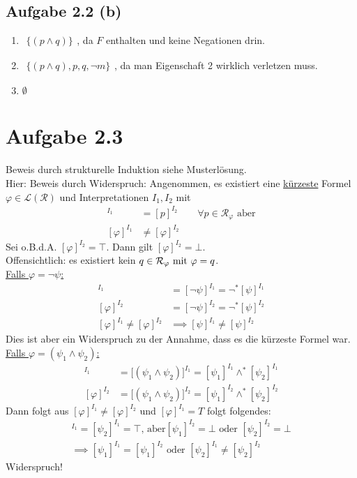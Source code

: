\documentclass[12pt,a4paper]{article}
\begin{document}
\subsection*{Aufgabe 2.2 (b)}
\begin{enumerate}[label=(\arabic*)]
\item $\begin{aligned}\big\lbrace
(p\wedge q)
\big\rbrace\end{aligned}$, da $F$ enthalten und keine Negationen drin.
\item $\begin{aligned}\big\lbrace
(p\wedge q), p, q, \neg m
\big\rbrace\end{aligned}$, da man Eigenschaft 2 wirklich verletzen muss.
\item $\emptyset$
\end{enumerate}

\section*{Aufgabe 2.3}
Beweis durch strukturelle Induktion siehe Musterlösung.\\
Hier: Beweis durch Widerspruch: Angenommen, es existiert eine \underline{kürzeste} Formel $\varphi\in\mathcal{L}(\mathcal{R})$ und Interpretationen $I_1,I_2$ mit 
\begin{align*}
[p]^{I_1}&=[p]^{I_2}\qquad\forall p\in\mathcal{R}_\varphi\text{ aber}\\
[\varphi]^{I_1}&\neq[\varphi]^{I_2}
\end{align*}
Sei o.B.d.A. $[\varphi]^{I_2}=\top$. Dann gilt $[\varphi]^{I_2}=\bot$.\\
Offensichtlich: es existiert kein $q\in\mathcal{R}_\varphi\mit\varphi=q$.\\
\underline{Falls $\varphi=\neg\psi$:}
\begin{align*}
[\varphi]^{I_1}&=[\neg\psi]^{I_1}=\neg^\ast[\psi]^{I_1}\\
[\varphi]^{I_2}&=[\neg\psi]^{I_2}=\neg^\ast[\psi]^{I_2}\\
[\varphi]^{I_1}\neq[\varphi]^{I_2}&\implies[\psi]^{I_1}\neq[\psi]^{I_2}
\end{align*}
Dies ist aber ein Widerspruch zu der Annahme, dass es die kürzeste Formel war.\\

\underline{Falls $\varphi=(\psi_1\wedge\psi_2)$:}
\begin{align*}
[\varphi]^{I_1}&=\big[(\psi_1\wedge\psi_2)\big]^{I_1}=[\psi_1]^{I_1}\wedge^\ast[\psi_2]^{I_1}\\
[\varphi]^{I_2}&=\big[(\psi_1\wedge\psi_2)\big]^{I_2}=[\psi_1]^{I_2}\wedge^\ast[\psi_2]^{I_2}
\end{align*}
Dann folgt aus $[\varphi]^{I_1}\neq[\varphi]^{I_2}$ und $[\varphi]^{I_1}=T$ folgt folgendes:
\begin{align*}
[\psi_1]^{I_1}=[\psi_2]^{I_1}=\top\text{, aber} [\psi_1]^{I_2}=\bot\text{ oder }[\psi_2]^{I_2}=\bot\\
\implies
[\psi_1]^{I_1}=[\psi_1]^{I_2}\text{ oder }[\psi_2]^{I_1}\neq[\psi_2]^{I_2}
\end{align*}
Widerspruch!\\
\end{document}
